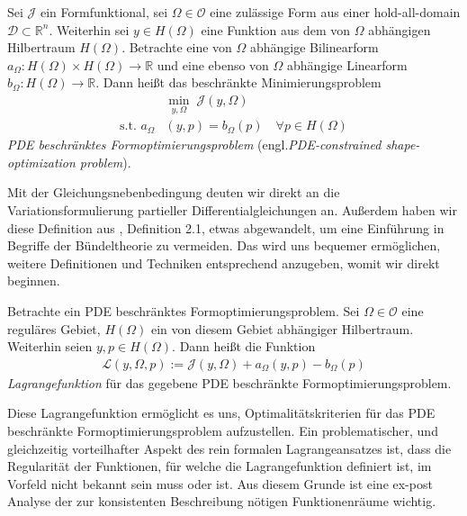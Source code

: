 \begin{defi}\label{Pde constrained shape}
Sei $\mathcal{J}$ ein Formfunktional, sei $\Omega \in \mathcal{O}$ eine zulässige Form aus einer hold-all-domain $\mathcal{D}\subset
\mathbb{R}^n$. Weiterhin sei $y\in H(\Omega)$ eine Funktion aus dem von $\Omega$ abhängigen Hilbertraum $H(\Omega)$. Betrachte eine von $\Omega$ abhängige Bilinearform $a_{\Omega}: H(\Omega) \times H(\Omega) \rightarrow \mathbb{R}$ und eine ebenso von $\Omega$ abhängige Linearform $b_{\Omega}: H(\Omega) \rightarrow \mathbb{R}$. Dann heißt das beschränkte Minimierungsproblem
\begin{equation}\label{PDE constrained equation}
	\begin{aligned}
	&\underset{y,\Omega}{\min}\;\mathcal{J}(y,\Omega) \\
	\text{s.t. } a_{\Omega}&(y,p) = b_{\Omega}(p) \quad \forall p\in H(\Omega)
	\end{aligned}
\end{equation}
\textit{PDE beschränktes Formoptimierungsproblem} (engl.\textit{PDE-constrained  \newline shape-optimization problem}).
\end{defi}

Mit der Gleichungsnebenbedingung deuten wir direkt an die Variationsformulierung partieller Differentialgleichungen an. Außerdem haben wir diese Definition aus \cite{LagrangeNewton}, Definition 2.1, etwas abgewandelt, um eine Einführung in Begriffe der Bündeltheorie zu vermeiden. Das wird uns bequemer ermöglichen, weitere Definitionen und Techniken entsprechend anzugeben, womit wir direkt beginnen.

\begin{defi}[Lagrangefunktion]\label{lagrangefunction}
Betrachte ein PDE beschränktes Formoptimierungsproblem. Sei $\Omega \in \mathcal{O}$ eine reguläres Gebiet, $H(\Omega)$ ein von diesem Gebiet abhängiger Hilbertraum. Weiterhin seien $y,p\in H(\Omega)$. Dann heißt die Funktion
\begin{align*}
	\mathcal{L}(y,\Omega, p) := \mathcal{J}(y,\Omega) + a_{\Omega}(y,p) - b_{\Omega}(p)
\end{align*}
\textit{Lagrangefunktion} für das gegebene PDE beschränkte Formoptimierungsproblem.
\end{defi}

Diese Lagrangefunktion ermöglicht es uns, Optimalitätskriterien für das PDE beschränkte Formoptimierungsproblem aufzustellen. Ein problematischer, und gleichzeitig vorteilhafter Aspekt des rein formalen Lagrangeansatzes ist, dass die Regularität der Funktionen, für welche die Lagrangefunktion definiert ist, im Vorfeld nicht bekannt sein muss oder ist. Aus diesem Grunde ist eine ex-post Analyse der zur konsistenten Beschreibung nötigen Funktionenräume wichtig. 

